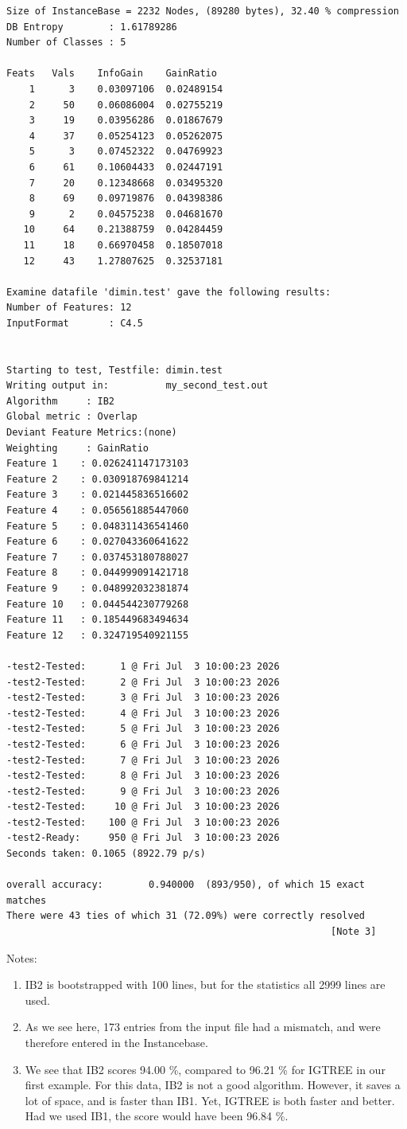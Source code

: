 \documentclass{report}
\begin{document}
\begin{footnotesize}
\begin{verbatim}
Size of InstanceBase = 2232 Nodes, (89280 bytes), 32.40 % compression
DB Entropy        : 1.61789286
Number of Classes : 5

Feats	Vals	InfoGain	GainRatio
    1      3	0.03097106	0.02489154
    2     50	0.06086004	0.02755219
    3     19	0.03956286	0.01867679
    4     37	0.05254123	0.05262075
    5      3	0.07452322	0.04769923
    6     61	0.10604433	0.02447191
    7     20	0.12348668	0.03495320
    8     69	0.09719876	0.04398386
    9      2	0.04575238	0.04681670
   10     64	0.21388759	0.04284459
   11     18	0.66970458	0.18507018
   12     43	1.27807625	0.32537181

Examine datafile 'dimin.test' gave the following results:
Number of Features: 12
InputFormat       : C4.5


Starting to test, Testfile: dimin.test
Writing output in:          my_second_test.out
Algorithm     : IB2
Global metric : Overlap
Deviant Feature Metrics:(none)
Weighting     : GainRatio
Feature 1	 : 0.026241147173103
Feature 2	 : 0.030918769841214
Feature 3	 : 0.021445836516602
Feature 4	 : 0.056561885447060
Feature 5	 : 0.048311436541460
Feature 6	 : 0.027043360641622
Feature 7	 : 0.037453180788027
Feature 8	 : 0.044999091421718
Feature 9	 : 0.048992032381874
Feature 10	 : 0.044544230779268
Feature 11	 : 0.185449683494634
Feature 12	 : 0.324719540921155

-test2-Tested:      1 @ Fri Jul  3 10:00:23 2026
-test2-Tested:      2 @ Fri Jul  3 10:00:23 2026
-test2-Tested:      3 @ Fri Jul  3 10:00:23 2026
-test2-Tested:      4 @ Fri Jul  3 10:00:23 2026
-test2-Tested:      5 @ Fri Jul  3 10:00:23 2026
-test2-Tested:      6 @ Fri Jul  3 10:00:23 2026
-test2-Tested:      7 @ Fri Jul  3 10:00:23 2026
-test2-Tested:      8 @ Fri Jul  3 10:00:23 2026
-test2-Tested:      9 @ Fri Jul  3 10:00:23 2026
-test2-Tested:     10 @ Fri Jul  3 10:00:23 2026
-test2-Tested:    100 @ Fri Jul  3 10:00:23 2026
-test2-Ready:     950 @ Fri Jul  3 10:00:23 2026
Seconds taken: 0.1065 (8922.79 p/s)

overall accuracy:        0.940000  (893/950), of which 15 exact matches
There were 43 ties of which 31 (72.09%) were correctly resolved
                                                         [Note 3]
\end{verbatim}
\end{footnotesize}


Notes:
\begin{enumerate}
\item IB2 is bootstrapped with 100 lines, but for the statistics all 2999
 lines are used.
\item As we see here, 173 entries from the input file had a mismatch,
and were therefore entered in the Instancebase.
\item We see that IB2 scores 94.00 \%, compared to 96.21 \% for IGTREE
  in our first example.  For this data, IB2 is not a good
  algorithm. However, it saves a lot of space, and is faster than
  IB1. Yet, IGTREE is both faster and better. Had we used IB1, the
  score would have been 96.84 \%.
\end{enumerate}
\clearpage
\end{document}
